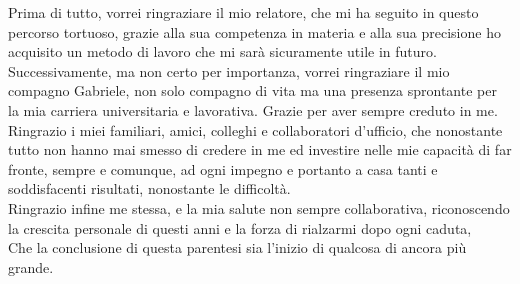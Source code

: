 Prima di tutto, vorrei ringraziare il mio relatore, che mi ha seguito in questo percorso tortuoso, grazie alla sua competenza in materia e alla sua precisione ho acquisito un metodo di lavoro che mi sarà sicuramente utile in futuro.
Successivamente, ma non certo per importanza, vorrei ringraziare il mio compagno Gabriele, non solo compagno di vita ma una presenza sprontante per la mia carriera universitaria e lavorativa. Grazie per aver sempre creduto in me.
\\Ringrazio i miei familiari, amici, colleghi e collaboratori d'ufficio, che nonostante tutto non hanno mai smesso di credere in me ed investire nelle mie capacità di far fronte, sempre e comunque, ad ogni impegno e portanto a casa tanti e soddisfacenti risultati, nonostante le difficoltà.
\\Ringrazio infine me stessa, e la mia salute non sempre collaborativa, riconoscendo la crescita personale di questi anni e la forza di rialzarmi dopo ogni caduta,
\\Che la conclusione di questa parentesi sia l'inizio di qualcosa di ancora più grande.
